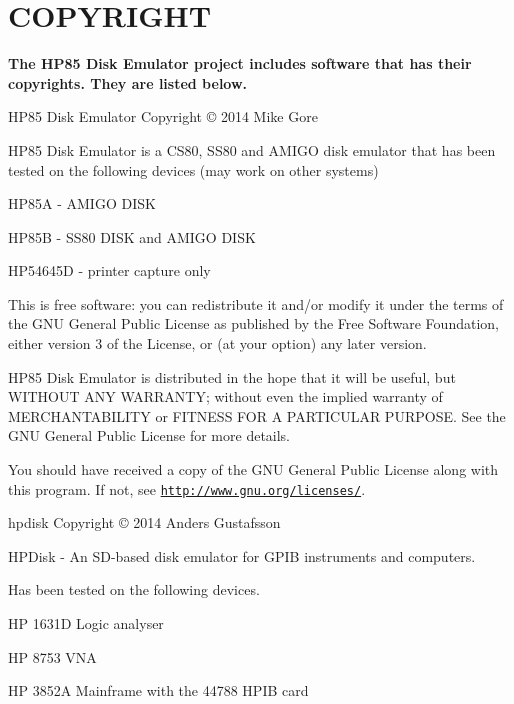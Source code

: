 \hypertarget{index_COPYRIGHT}{}\section{C\-O\-P\-Y\-R\-I\-G\-H\-T}\label{index_COPYRIGHT}
{\bfseries The H\-P85 Disk Emulator project includes software that has their copyrights. They are listed below.}





\begin{DoxyParagraph}{H\-P85 Disk Emulator Copyright \copyright{} 2014 Mike Gore}

\end{DoxyParagraph}
H\-P85 Disk Emulator is a C\-S80, S\-S80 and A\-M\-I\-G\-O disk emulator that has been tested on the following devices (may work on other systems)
\begin{DoxyItemize}
\item H\-P85\-A -\/ A\-M\-I\-G\-O D\-I\-S\-K
\item H\-P85\-B -\/ S\-S80 D\-I\-S\-K and A\-M\-I\-G\-O D\-I\-S\-K
\item H\-P54645\-D -\/ printer capture only
\end{DoxyItemize}

This is free software\-: you can redistribute it and/or modify it under the terms of the G\-N\-U General Public License as published by the Free Software Foundation, either version 3 of the License, or (at your option) any later version.

H\-P85 Disk Emulator is distributed in the hope that it will be useful, but W\-I\-T\-H\-O\-U\-T A\-N\-Y W\-A\-R\-R\-A\-N\-T\-Y; without even the implied warranty of M\-E\-R\-C\-H\-A\-N\-T\-A\-B\-I\-L\-I\-T\-Y or F\-I\-T\-N\-E\-S\-S F\-O\-R A P\-A\-R\-T\-I\-C\-U\-L\-A\-R P\-U\-R\-P\-O\-S\-E. See the G\-N\-U General Public License for more details.

You should have received a copy of the G\-N\-U General Public License along with this program. If not, see \href{http://www.gnu.org/licenses/}{\tt http\-://www.\-gnu.\-org/licenses/}.





\begin{DoxyParagraph}{hpdisk Copyright \copyright{} 2014 Anders Gustafsson }

\end{DoxyParagraph}
H\-P\-Disk -\/ An S\-D-\/based disk emulator for G\-P\-I\-B instruments and computers.\par
 Has been tested on the following devices.
\begin{DoxyItemize}
\item H\-P 1631\-D Logic analyser
\item H\-P 8753 V\-N\-A
\item H\-P 3852\-A Mainframe with the 44788 H\-P\-I\-B card
\end{DoxyItemize}


